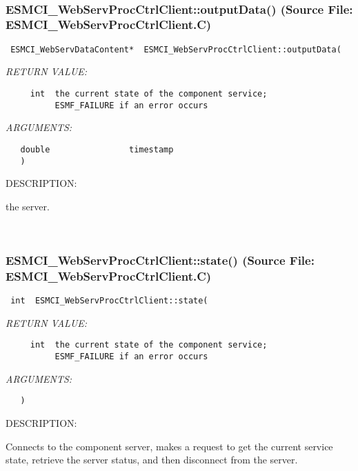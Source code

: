 \mbox{}\hrulefill\
 
\subsubsection{ESMCI\_WebServProcCtrlClient::outputData() (Source File: ESMCI\_WebServProcCtrlClient.C)}


  
\begin{verbatim} ESMCI_WebServDataContent*  ESMCI_WebServProcCtrlClient::outputData(\end{verbatim}{\em RETURN VALUE:}
\begin{verbatim}     int  the current state of the component service;
          ESMF_FAILURE if an error occurs\end{verbatim}{\em ARGUMENTS:}
\begin{verbatim}   double                timestamp
   )\end{verbatim}
{\sf DESCRIPTION:\\ }


      the server.
   
 
\mbox{}\hrulefill\
 
\subsubsection{ESMCI\_WebServProcCtrlClient::state() (Source File: ESMCI\_WebServProcCtrlClient.C)}


  
\begin{verbatim} int  ESMCI_WebServProcCtrlClient::state(\end{verbatim}{\em RETURN VALUE:}
\begin{verbatim}     int  the current state of the component service;
          ESMF_FAILURE if an error occurs\end{verbatim}{\em ARGUMENTS:}
\begin{verbatim}   )\end{verbatim}
{\sf DESCRIPTION:\\ }


      Connects to the component server, makes a request to get the current
      service state, retrieve the server status, and then disconnect from
      the server.
   
 
